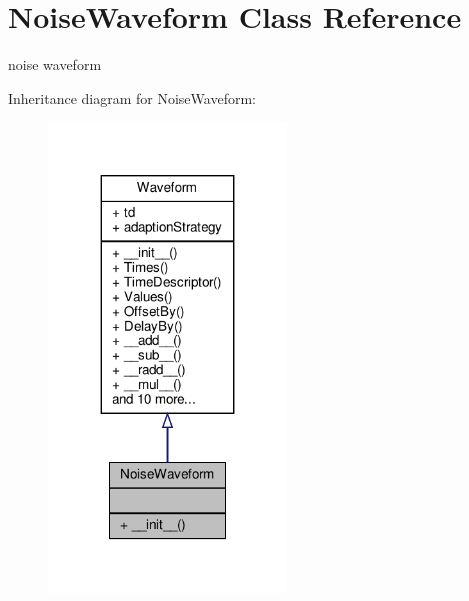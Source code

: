 \hypertarget{classSignalIntegrity_1_1TimeDomain_1_1Waveform_1_1NoiseWaveform_1_1NoiseWaveform}{}\section{Noise\+Waveform Class Reference}
\label{classSignalIntegrity_1_1TimeDomain_1_1Waveform_1_1NoiseWaveform_1_1NoiseWaveform}


noise waveform  




Inheritance diagram for Noise\+Waveform\+:\nopagebreak
\begin{figure}[H]
\begin{center}
\leavevmode
\includegraphics[width=179pt]{classSignalIntegrity_1_1TimeDomain_1_1Waveform_1_1NoiseWaveform_1_1NoiseWaveform__inherit__graph}
\end{center}
\end{figure}


